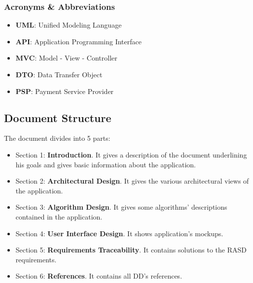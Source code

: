 \subsubsection{Acronyms \& Abbreviations}
\begin{itemize}
\item \textbf{UML}: Unified Modeling Language
\item \textbf{API}: Application Programming Interface
\item \textbf{MVC}: Model - View - Controller
\item \textbf{DTO}: Data Transfer Object
\item \textbf{PSP}: Payment Service Provider
\end{itemize}


\subsection{Document Structure}
The document divides into 5 parts:
\begin{itemize}

\item Section 1: \textbf{Introduction}. It gives a description of the document underlining his goals and gives basic information about the application.

\item Section 2: \textbf{Architectural Design}. It gives the various architectural views of the application.

\item Section 3: \textbf{Algorithm Design}. It gives some algorithms' descriptions contained in the application.

\item Section 4: \textbf{User Interface Design}. It shows application's mockups.

\item Section 5: \textbf{Requirements Traceability}. It contains solutions to the RASD requirements.

\item Section 6: \textbf{References}. It contains all DD's references.

\end{itemize}

